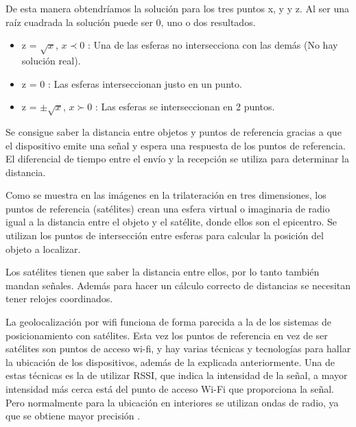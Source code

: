 De esta manera obtendríamos la solución para los tres puntos x, y y z. Al ser una raíz cuadrada la solución puede ser 0, uno o dos resultados.

\begin{itemize}
\item 
	z = $\sqrt{x}$, $x \prec 0$ : Una de las esferas no intersecciona con las demás (No hay solución real).
\item 
	z = 0 : Las esferas interseccionan justo en un punto.
\item 
	z = $\pm\sqrt{x}$, $x \succ 0$ : Las esferas se interseccionan en 2 puntos.
	
\end{itemize}

Se consigue saber la distancia entre objetos y puntos de referencia gracias a que el dispositivo emite una señal y espera una respuesta de los puntos de referencia. El diferencial de tiempo entre el envío y la recepción se utiliza para determinar la distancia.

Como se muestra en las imágenes en la trilateración en tres dimensiones, los puntos de referencia (satélites) crean una esfera virtual o imaginaria de radio igual a la distancia entre el objeto y el satélite, donde ellos son el epicentro. Se utilizan los puntos de intersección entre esferas para calcular la posición del objeto a localizar.

Los satélites tienen que saber la distancia entre ellos, por lo tanto también mandan señales. Además para hacer un cálculo correcto de distancias se necesitan tener relojes coordinados.
\\





La geolocalización por wifi funciona de forma parecida a la de los sistemas de posicionamiento con satélites. Esta vez los puntos de referencia en vez de ser satélites son puntos de acceso wi-fi, y hay varias técnicas y tecnologías para hallar la ubicación de los dispositivos, además de la explicada anteriormente. Una de estas técnicas es la de utilizar RSSI, que indica la intensidad de la señal, a mayor intensidad más cerca está del punto de acceso Wi-Fi que proporciona la señal.  Pero normalmente para la ubicación en interiores se utilizan ondas de radio, ya que se obtiene mayor precisión \cite{wifiloc}. 

